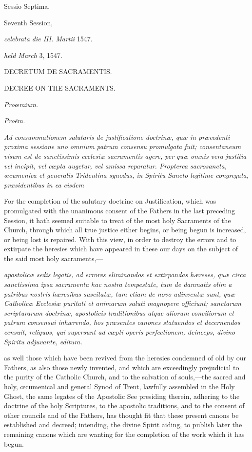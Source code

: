 
Sessio Septima,

Seventh Session,

\emph{celebrata die III. Martii} 1547.

\emph{held March} 3, 1547.

DECRETUM DE SACRAMENTIS.

DECREE ON THE SACRAMENTS.

\emph{Proœmium.}

\emph{Proëm.}

\emph{Ad consummationem salutaris de justificatione doctrinæ, quæ in præcedenti proxima sessione uno omnium patrum consensu promulgata fuit; consentaneum visum est de sanctissimis ecclesiæ sacramentis agere, per quæ omnis vera justitia vel incipit, vel cœpta augetur, vel amissa reparatur. Propterea sacrosancta, œcumenica et generalis Tridentina synodus, in Spiritu Sancto legitime congregata, præsidentibus in ea eisdem }

For the completion of the salutary doctrine on Justification, which was promulgated with the unanimous consent of the Fathers in the last preceding Session, it hath seemed suitable to treat of the most holy Sacraments of the Church, through which all true justice either begins, or being begun is increased, or being lost is repaired. With this view, in order to destroy the errors and to extirpate the heresies which have appeared in these our days on the subject of the said most holy sacraments,—

\emph{apostolicæ sedis legatis, ad errores eliminandos et extirpandas hæreses, quæ circa sanctissima ipsa sacramenta hac nostra tempestate, tum de damnatis olim a patribus nostris hæresibus suscitatæ, tum etiam de novo adinventæ sunt, quæ Catholicæ Ecclesiæ puritati et animarum saluti magnopere officiunt; sanctarum scripturarum doctrinæ, apostolicis traditionibus atque aliorum conciliorum et patrum consensui inhærendo, hos præsentes canones statuendos et decernendos censuit, reliquos, qui supersunt ad cœpti operis perfectionem, deinceps, divino Spiritu adjuvante, editura.}

as well those which have been revived from the heresies condemned of old by our Fathers, as also those newly invented, and which are exceedingly prejudicial to the purity of the Catholic Church, and to the salvation of souls,—the sacred and holy, œcumenical and general Synod of Trent, lawfully assembled in the Holy Ghost, the same legates of the Apostolic See presiding therein, adhering to the doctrine of the holy Scriptures, to the apostolic traditions, and to the consent of other councils and of the Fathers, has thought fit that these present canons be established and decreed; intending, the divine Spirit aiding, to publish later the remaining canons which are wanting for the completion of the work which it has begun.

